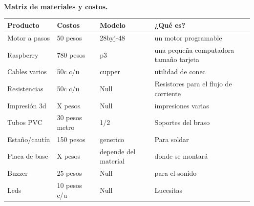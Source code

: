 \documentclass[letterpaper]{article}
\begin{document}
   \begin{large}
       \begin{large}
       \textbf{Matriz de materiales y costos.}
           \begin{table}[]
\begin{tabular}{|l|l|l|l|} 
\hline
Producto      & Costos         & Modelo               & ¿Qué es?                               \\ \hline
Motor a pasos & 50 pesos       & 28byj-48             & un motor programable                   \\ \hline
Raspberry     & 780 pesos      & p3                   & una pequeña computadora tamaño tarjeta \\ \hline
Cables varios & 50c c/u        & cupper               & utilidad de conec                      \\ \hline
Resistencias  & 50c c/u        & Null                 & Resistores para el flujo de corriente  \\ \hline
Impresión 3d  & X pesos        & Null                 & impresiones varias                     \\ \hline
Tubos PVC     & 30 pesos metro & 1/2                  & Soportes del braso                     \\ \hline
Estaño/cautín & 150 pesos      & generico             & Para soldar                            \\ \hline
Placa de base & X pesos        & depende del material & donde se montará                       \\ \hline
Buzzer        & 25 pesos       & Null                 & para el sonido                         \\ \hline
Leds          & 10 pesos c/u   & Null                 & Lucesitas                              \\ \hline
\end{tabular}
\end{table}
       \end{large}
   \end{large}
\end{document}
